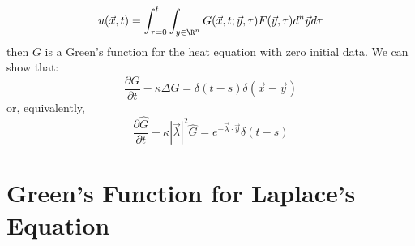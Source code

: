 \documentclass[../Main.tex]{subfiles}
\begin{document}
\begin{equation*}
    u(\vec{x}, t) = \int_{\tau = 0}^{t} \int_{y \in \R^n} G(\vec{x}, t;\vec{y}, \tau) F(\vec{y}, \tau)d^n \vec{y} d\tau 
\end{equation*}
then $G$ is a Green's function for the heat equation with zero initial data. We can show that:
\begin{equation*}
    \frac{\partial G}{\partial t} - \kappa \Delta G = \delta(t - s) \delta(\vec{x} - \vec{y})
\end{equation*}
or, equivalently,
\begin{equation*}
    \frac{\partial \hat{G}}{\partial t} + \kappa |\vec{\lambda}|^2 \hat{G} = e^{-\vec{\lambda} \cdot \vec{y}} \delta(t - s)
\end{equation*}
\section{Green's Function for Laplace's Equation}
\end{document}
